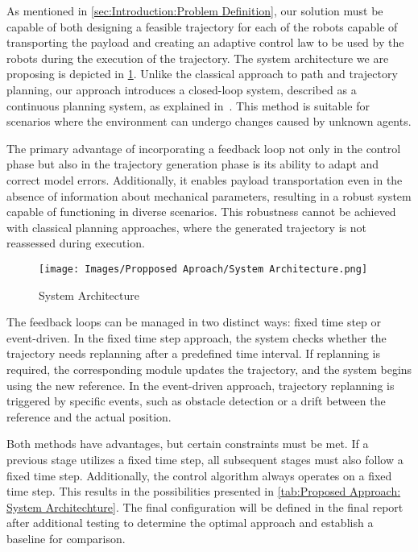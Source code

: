 As mentioned in \ref{sec:Introduction:Problem Definition}, our solution must be capable of both designing a feasible trajectory for each of the robots capable of transporting the payload and creating an adaptive control law to be used by the robots during the execution of the trajectory. The system architecture we are proposing is depicted in \ref{fig:Proposed Approach: System Architecture : System Architecture}. Unlike the classical approach to path and trajectory planning, our approach introduces a closed-loop system, described as a continuous planning system, as explained in~\cite{durfee1999survey}. This method is suitable for scenarios where the environment can undergo changes caused by unknown agents. 

The primary advantage of incorporating a feedback loop not only in the control phase but also in the trajectory generation phase is its ability to adapt and correct model errors. Additionally, it enables payload transportation even in the absence of information about mechanical parameters, resulting in a robust system capable of functioning in diverse scenarios. This robustness cannot be achieved with classical planning approaches, where the generated trajectory is not reassessed during execution.

\begin{figure}[H]
    \centering
    \texttt{[image: Images/Propposed Aproach/System Architecture.png]}
    \caption{System Architecture}
    \label{fig:Proposed Approach: System Architecture : System Architecture}
\end{figure}

The feedback loops can be managed in two distinct ways: fixed time step or event-driven. In the fixed time step approach, the system checks whether the trajectory needs replanning after a predefined time interval. If replanning is required, the corresponding module updates the trajectory, and the system begins using the new reference. In the event-driven approach, trajectory replanning is triggered by specific events, such as obstacle detection or a drift between the reference and the actual position. 

Both methods have advantages, but certain constraints must be met. If a previous stage utilizes a fixed time step, all subsequent stages must also follow a fixed time step. Additionally, the control algorithm always operates on a fixed time step. This results in the possibilities presented in \ref{tab:Proposed Approach: System Architechture}. The final configuration will be defined in the final report after additional testing to determine the optimal approach and establish a baseline for comparison.

